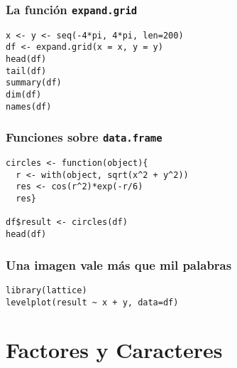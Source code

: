\documentclass[xcolor={usenames,svgnames,dvipsnames}]{beamer}
\begin{document}
\begin{frame}[fragile]
\frametitle{La función \texttt{expand.grid}}
\label{sec-4-2-4}



\lstset{language=R}
\begin{lstlisting}
x <- y <- seq(-4*pi, 4*pi, len=200)
df <- expand.grid(x = x, y = y)
head(df)
tail(df)
summary(df)
dim(df)
names(df)
\end{lstlisting}
\end{frame}
\begin{frame}[fragile]
\frametitle{Funciones sobre \texttt{data.frame}}
\label{sec-4-2-5}



\lstset{language=R}
\begin{lstlisting}
circles <- function(object){
  r <- with(object, sqrt(x^2 + y^2))
  res <- cos(r^2)*exp(-r/6)
  res}

df$result <- circles(df)
head(df)
\end{lstlisting}
\end{frame}
\begin{frame}[fragile]
\frametitle{Una imagen vale más que mil palabras}
\label{sec-4-2-6}


\lstset{language=R}
\begin{lstlisting}
library(lattice)
levelplot(result ~ x + y, data=df)
\end{lstlisting}
\end{frame}
\section{Factores y Caracteres}
\label{sec-5}
\end{document}
